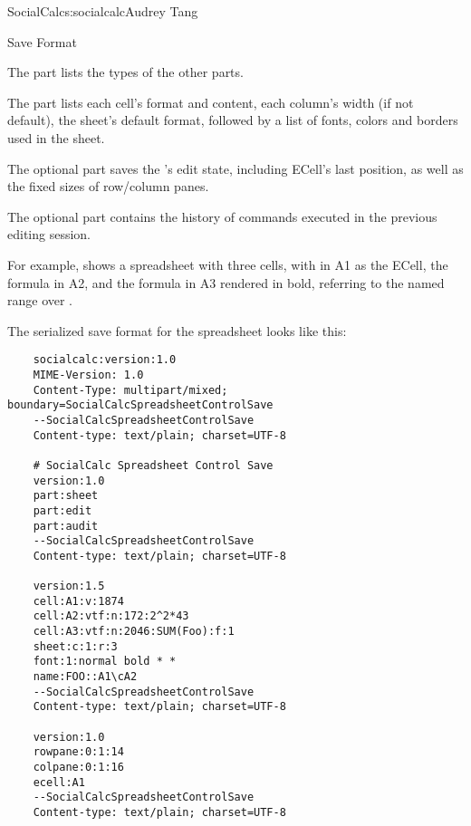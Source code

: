 \begin{aosachapter}{SocialCalc}{s:socialcalc}{Audrey Tang}
\begin{aosasect1}{Save Format}
\begin{aosaitemize}

  \item The  part lists the types of the other parts.

  \item The  part lists each cell's format and content, each
  column's width (if not default), the sheet's default format, followed
  by a list of fonts, colors and borders used in the sheet.

  \item The optional  part saves the 's
  edit state, including ECell's last position, as well as the fixed sizes of
  row/column panes.

  \item The optional  part contains the history of
 commands executed in the previous editing session.

\end{aosaitemize}

For example,  shows a spreadsheet with three
cells, with  in A1 as the ECell, the formula 
in A2, and the formula  in A3 rendered in bold,
referring to the named range  over .


The serialized save format for the spreadsheet looks like this:

\begin{verbatim}
    socialcalc:version:1.0
    MIME-Version: 1.0
    Content-Type: multipart/mixed; boundary=SocialCalcSpreadsheetControlSave
    --SocialCalcSpreadsheetControlSave
    Content-type: text/plain; charset=UTF-8

    # SocialCalc Spreadsheet Control Save
    version:1.0
    part:sheet
    part:edit
    part:audit
    --SocialCalcSpreadsheetControlSave
    Content-type: text/plain; charset=UTF-8

    version:1.5
    cell:A1:v:1874
    cell:A2:vtf:n:172:2^2*43
    cell:A3:vtf:n:2046:SUM(Foo):f:1
    sheet:c:1:r:3
    font:1:normal bold * *
    name:FOO::A1\cA2
    --SocialCalcSpreadsheetControlSave
    Content-type: text/plain; charset=UTF-8

    version:1.0
    rowpane:0:1:14
    colpane:0:1:16
    ecell:A1
    --SocialCalcSpreadsheetControlSave
    Content-type: text/plain; charset=UTF-8


\end{verbatim}
\end{aosasect1}
\end{aosachapter}
